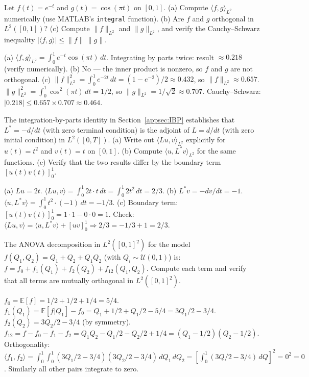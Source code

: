 \begin{selfcheck}
Let $f(t) = e^{-t}$ and $g(t) = \cos(\pi t)$ on $[0, 1]$.
(a) Compute $\langle f, g \rangle_{L^2}$ numerically (use MATLAB's
\texttt{integral} function).
(b) Are $f$ and $g$ orthogonal in $L^2([0,1])$?
(c) Compute $\|f\|_{L^2}$ and $\|g\|_{L^2}$, and verify the
Cauchy--Schwarz inequality $|\langle f,g\rangle| \leq \|f\|\,\|g\|$.
\end{selfcheck}
\begin{scAnswer}
(a) $\langle f, g\rangle_{L^2} = \int_0^1 e^{-t}\cos(\pi t)\,dt$.
Integrating by parts twice: result $\approx 0.218$ (verify numerically).
(b) No — the inner product is nonzero, so $f$ and $g$ are not orthogonal.
(c) $\|f\|_{L^2}^2 = \int_0^1 e^{-2t}\,dt = (1-e^{-2})/2 \approx 0.432$,
so $\|f\|_{L^2} \approx 0.657$.
$\|g\|_{L^2}^2 = \int_0^1 \cos^2(\pi t)\,dt = 1/2$, so $\|g\|_{L^2} = 1/\sqrt{2} \approx 0.707$.
Cauchy--Schwarz: $|0.218| \leq 0.657 \times 0.707 \approx 0.464$. \checkmark
\end{scAnswer}

\begin{selfcheck}
The integration-by-parts identity in Section~\ref{appsec:IBP}
establishes that $L^* = -d/dt$ (with zero terminal condition)
is the adjoint of $L = d/dt$ (with zero initial condition)
in $L^2([0,T])$.
(a) Write out $\langle Lu, v\rangle_{L^2}$ explicitly for
$u(t) = t^2$ and $v(t) = t$ on $[0,1]$.
(b) Compute $\langle u, L^*v\rangle_{L^2}$ for the same functions.
(c) Verify that the two results differ by the boundary term $[u(t)v(t)]_0^1$.
\end{selfcheck}
\begin{scAnswer}
(a) $Lu = 2t$. $\langle Lu, v\rangle = \int_0^1 2t \cdot t\,dt = \int_0^1 2t^2\,dt = 2/3$.
(b) $L^*v = -dv/dt = -1$. $\langle u, L^*v\rangle = \int_0^1 t^2 \cdot(-1)\,dt = -1/3$.
(c) Boundary term: $[u(t)v(t)]_0^1 = 1\cdot1 - 0\cdot0 = 1$.
Check: $\langle Lu,v\rangle = \langle u, L^*v\rangle + [uv]_0^1 \Rightarrow 2/3 = -1/3 + 1 = 2/3$. \checkmark
\end{scAnswer}

\begin{selfcheck}
The ANOVA decomposition in $L^2([0,1]^2)$ for the model
$f(Q_1, Q_2) = Q_1 + Q_2 + Q_1 Q_2$ (with $Q_i \sim \mathcal{U}(0,1)$) is:
$f = f_0 + f_1(Q_1) + f_2(Q_2) + f_{12}(Q_1,Q_2)$.
Compute each term and verify that all terms are mutually orthogonal
in $L^2([0,1]^2)$.
\end{selfcheck}
\begin{scAnswer}
$f_0 = \mathbb{E}[f] = 1/2 + 1/2 + 1/4 = 5/4$.
$f_1(Q_1) = \mathbb{E}[f|Q_1] - f_0 = Q_1 + 1/2 + Q_1/2 - 5/4 = 3Q_1/2 - 3/4$.
$f_2(Q_2) = 3Q_2/2 - 3/4$ (by symmetry).
$f_{12} = f - f_0 - f_1 - f_2 = Q_1Q_2 - Q_1/2 - Q_2/2 + 1/4 = (Q_1-1/2)(Q_2-1/2)$.
Orthogonality: $\langle f_1, f_2\rangle = \int_0^1\int_0^1 (3Q_1/2-3/4)(3Q_2/2-3/4)\,dQ_1\,dQ_2
= \left[\int_0^1(3Q/2-3/4)\,dQ\right]^2 = 0^2 = 0$. \checkmark
Similarly all other pairs integrate to zero.
\end{scAnswer}
